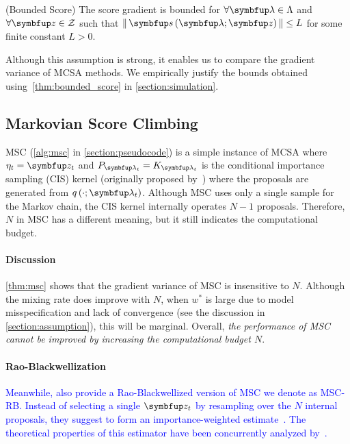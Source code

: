 \begin{assumption}{(Bounded Score)}\label{thm:bounded_score}
  The score gradient is bounded for \(\forall \vlambda \in \Lambda\) and \(\forall \vz \in \mathcal{Z}\) such that \(\norm{\vs\left(\vlambda; \vz\right)} \leq L \) for some finite constant \(L > 0\).
\end{assumption}
%
Although this assumption is strong, it enables us to compare the gradient variance of MCSA methods.
We empirically justify the bounds obtained using~\cref{thm:bounded_score} in \cref{section:simulation}.

\vspace{-0.07in}
\subsection{Markovian Score Climbing}
\vspace{-0.07in}

MSC (\cref{alg:msc} in \cref{section:pseudocode}) is a simple instance of MCSA where \(\eta_t = \vz_t\) and \(P_{\vlambda_t} = K_{\vlambda_t}\) is the conditional importance sampling (CIS) kernel (originally proposed by~\citet{andrieu_uniform_2018}) where the proposals are generated from \(q\left(\cdot; \vlambda_t\right)\).
Although MSC uses only a single sample for the Markov chain, the CIS kernel internally operates \(N-1\) proposals.
Therefore, \(N\) in MSC has a different meaning, but it still indicates the computational budget.


\vspace{0.04in}


\vspace{-0.1in}
\paragraph{Discussion}
\cref{thm:msc} shows that the gradient variance of MSC is insensitive to \(N\).
Although the mixing rate does improve with \(N\), when \(w^*\) is large due to model misspecification and lack of convergence (see the discussion in \cref{section:assumption}), this will be marginal.
Overall, \textit{the performance of MSC cannot be improved by increasing the computational budget \(N\)}.

\vspace{-0.1in}
\paragraph{Rao-Blackwellization}
\textcolor{blue}{
Meanwhile, \citeauthor{NEURIPS2020_b2070693} also provide a Rao-Blackwellized version of MSC we denote as MSC-RB.
Instead of selecting a single \(\vz_t\) by resampling over the \(N\) internal proposals, they suggest to form an importance-weighted estimate~\citep{robert_monte_2004}.
The theoretical properties of this estimator have been concurrently analyzed by~\citet{cardoso_brsnis_2022}.
}

